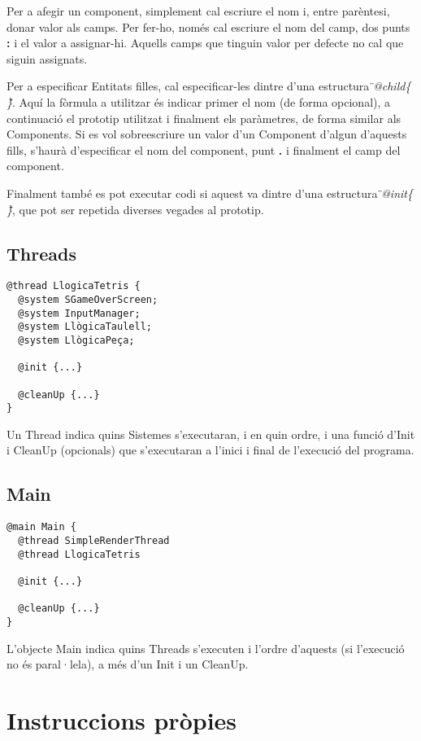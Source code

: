 Per a afegir un component, simplement cal escriure el nom i, entre parèntesi, donar valor als camps. Per fer-ho, només cal escriure el nom del camp, dos punts {\bf :} i el valor a assignar-hi. Aquells camps que tinguin valor per defecte no cal que siguin assignats.

Per a especificar Entitats filles, cal especificar-les dintre d'una estructura {\em\"{}@child\{ \}\"{}}. Aquí la fòrmula a utilitzar és indicar primer el nom (de forma opcional), a continuació el prototip utilitzat i finalment els paràmetres, de forma similar als Components. Si es vol sobreescriure un valor d'un Component d'algun d'aquests fills, s'haurà d'especificar el nom del component, punt {\bf .} i finalment el camp del component.

Finalment també es pot executar codi si aquest va dintre d'una estructura {\em\"{}@init\{ \}\"{}}, que pot ser repetida diverses vegades al prototip.

\subsection{Threads}

\begin{verbatim}
@thread LlogicaTetris {
  @system SGameOverScreen;
  @system InputManager;
  @system LlògicaTaulell;
  @system LlògicaPeça;
  
  @init {...}
  
  @cleanUp {...}
}
\end{verbatim}

Un Thread indica quins Sistemes s'executaran, i en quin ordre, i una funció d'Init i CleanUp (opcionals) que s'executaran a l'inici i final de l'execució del programa.

\subsection{Main}

\begin{verbatim}
@main Main {
  @thread SimpleRenderThread
  @thread LlogicaTetris
  
  @init {...}
  
  @cleanUp {...}
}
\end{verbatim}

L'objecte Main indica quins Threads s'executen i l'ordre d'aquests (si l'execució no és paral·lela), a més d'un Init i un CleanUp.

\section{Instruccions pròpies}

